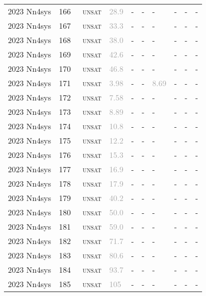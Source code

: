\begin{center}
{\begin{longtable}{@{}llllllllll@{}}
2023 Nn4sys & 166 & ~\textsc{unsat} & \textcolor{darkgray}{28.9} & - & - & - & - & - & - \\
2023 Nn4sys & 167 & ~\textsc{unsat} & \textcolor{darkgray}{33.3} & - & - & - & - & - & - \\
2023 Nn4sys & 168 & ~\textsc{unsat} & \textcolor{darkgray}{38.0} & - & - & - & - & - & - \\
2023 Nn4sys & 169 & ~\textsc{unsat} & \textcolor{darkgray}{42.6} & - & - & - & - & - & - \\
2023 Nn4sys & 170 & ~\textsc{unsat} & \textcolor{darkgray}{46.8} & - & - & - & - & - & - \\
2023 Nn4sys & 171 & ~\textsc{unsat} & \textcolor{darkgray}{3.98} & - & - & \textcolor{darkgray}{8.69} & - & - & - \\
2023 Nn4sys & 172 & ~\textsc{unsat} & \textcolor{darkgray}{7.58} & - & - & - & - & - & - \\
2023 Nn4sys & 173 & ~\textsc{unsat} & \textcolor{darkgray}{8.89} & - & - & - & - & - & - \\
2023 Nn4sys & 174 & ~\textsc{unsat} & \textcolor{darkgray}{10.8} & - & - & - & - & - & - \\
2023 Nn4sys & 175 & ~\textsc{unsat} & \textcolor{darkgray}{12.2} & - & - & - & - & - & - \\
2023 Nn4sys & 176 & ~\textsc{unsat} & \textcolor{darkgray}{15.3} & - & - & - & - & - & - \\
2023 Nn4sys & 177 & ~\textsc{unsat} & \textcolor{darkgray}{16.9} & - & - & - & - & - & - \\
2023 Nn4sys & 178 & ~\textsc{unsat} & \textcolor{darkgray}{17.9} & - & - & - & - & - & - \\
2023 Nn4sys & 179 & ~\textsc{unsat} & \textcolor{darkgray}{40.2} & - & - & - & - & - & - \\
2023 Nn4sys & 180 & ~\textsc{unsat} & \textcolor{darkgray}{50.0} & - & - & - & - & - & - \\
2023 Nn4sys & 181 & ~\textsc{unsat} & \textcolor{darkgray}{59.0} & - & - & - & - & - & - \\
2023 Nn4sys & 182 & ~\textsc{unsat} & \textcolor{darkgray}{71.7} & - & - & - & - & - & - \\
2023 Nn4sys & 183 & ~\textsc{unsat} & \textcolor{darkgray}{80.6} & - & - & - & - & - & - \\
2023 Nn4sys & 184 & ~\textsc{unsat} & \textcolor{darkgray}{93.7} & - & - & - & - & - & - \\
2023 Nn4sys & 185 & ~\textsc{unsat} & \textcolor{darkgray}{105} & - & - & - & - & - & - \\

\end{longtable}}
\end{center}
